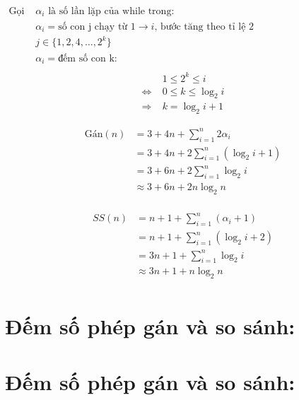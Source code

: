 \documentclass[12pt, letterpaper]{article}
\begin{document}
$ \begin{aligned}
		\text{Gọi } & \alpha_i \text{ là số lần lặp của while trong:}                              \\
		            & \alpha_i = \text{số con j chạy từ 1} \rightarrow i \text{, bước tăng theo tỉ lệ 2} \\
                    & j \in \{ 1, 2, 4, \ldots, 2^k \} \\
		            & \alpha_i = \text{đếm số con k:} \\
	\end{aligned} $ \\

\begin{align*}
    & 1 \leq 2^k \leq i \\
    \Leftrightarrow\; & 0 \leq k \leq \log_2{i} \\
    \Rightarrow\; & k = \log_2{i} + 1
\end{align*}

\begin{align*}
    \text{Gán}(n) & = 3 + 4n + \sum^{n}_{i = 1} 2 \alpha_i \\
                  & = 3 + 4n + 2 \sum^{n}_{i = 1} (\log_2{i} + 1) \\
                  & = 3 + 6n + 2 \sum^{n}_{i = 1} \log_2{i} \\
                  & \approx 3 + 6n + 2 n \log_2{n} \\
\end{align*}

\begin{align*}
	SS(n) & = n + 1 + \sum^{n}_{i = 1} (\alpha_i + 1)           \\
          & = n + 1 + \sum^{n}_{i = 1} (\log_2{i} + 2)           \\
          & = 3n + 1 + \sum^{n}_{i = 1} \log_2{i}           \\
          & \approx 3n + 1 + n \log_2{n}           \\
\end{align*}


\section{Đếm số phép gán và so sánh:}
\section{Đếm số phép gán và so sánh:}
\end{document}
